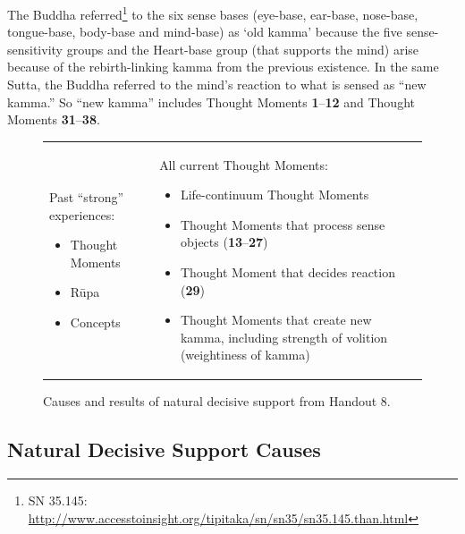 The Buddha referred\footnote{SN 35.145: \url{http://www.accesstoinsight.org/tipitaka/sn/sn35/sn35.145.than.html}} to the six sense bases (eye-base, ear-base, nose-base, tongue-base, body-base and mind-base) as ‘old kamma’ because the five sense-sensitivity groups and the Heart-base group (that supports the mind) arise because of the rebirth-linking kamma from the previous existence. In the same Sutta, the Buddha referred to the mind’s reaction to what is sensed as ``new kamma.'' So ``new kamma'' includes Thought Moments \textbf{1}--\textbf{12} and Thought Moments \textbf{31}--\textbf{38}.

\begin{figure}[H]
\begin{tabular*}{\textwidth}{L{\tabcolsep} | L{\tabcolsep}}
\toprule
{} &  \\
\midrule

Past “strong” experiences:
\begin{itemize}
\item Thought Moments
\item Rūpa
\item Concepts
\end{itemize}

&
All current Thought Moments:
\begin{itemize}
\item Life-continuum Thought Moments
\item Thought Moments that process sense objects (\textbf{13}--\textbf{27})
\item Thought Moment that decides reaction (\textbf{29})
\item Thought Moments that create new kamma, including strength of volition (weightiness of kamma)\vspace*{-\baselineskip}
\end{itemize}

\\

\bottomrule

\end{tabular*}
\caption{Causes and results of natural decisive support from Handout 8.}
\label{fig:NDS}
\end{figure}

\subsection*{Natural Decisive Support Causes}

